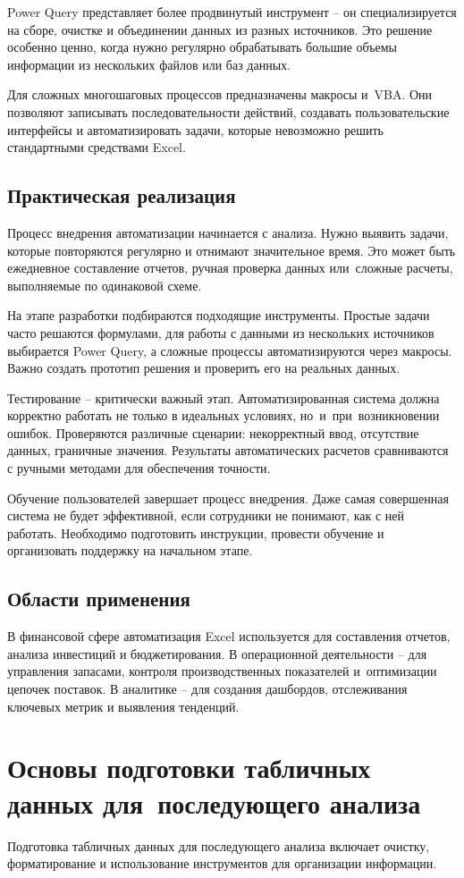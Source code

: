 \documentclass{ou}
\begin{document}
Power Query представляет более продвинутый инструмент -- он специализируется на сборе, очистке и объединении данных из разных источников. Это решение особенно ценно, когда нужно регулярно обрабатывать большие объемы информации из нескольких файлов или баз данных.

Для сложных многошаговых процессов предназначены макросы и~VBA. Они позволяют записывать последовательности действий, создавать пользовательские интерфейсы и автоматизировать задачи, которые невозможно решить стандартными средствами Excel.
\subsection{Практическая реализация}
Процесс внедрения автоматизации начинается с анализа. Нужно выявить задачи, которые повторяются регулярно и отнимают значительное время. Это может быть ежедневное составление отчетов, ручная проверка данных или~сложные расчеты, выполняемые по одинаковой схеме.

На этапе разработки подбираются подходящие инструменты. Простые задачи часто решаются формулами, для работы с данными из нескольких источников выбирается Power Query, а сложные процессы автоматизируются через макросы. Важно создать прототип решения и проверить его на реальных данных.

Тестирование -- критически важный этап. Автоматизированная система должна корректно работать не только в идеальных условиях, но~и~при~возникновении ошибок. Проверяются различные сценарии: некорректный ввод, отсутствие данных, граничные значения. Результаты автоматических расчетов сравниваются с ручными методами для обеспечения точности.

Обучение пользователей завершает процесс внедрения. Даже самая совершенная система не будет эффективной, если сотрудники не понимают, как с ней работать. Необходимо подготовить инструкции, провести обучение и организовать поддержку на начальном этапе.
\subsection{Области применения}
В финансовой сфере автоматизация Excel используется для составления отчетов, анализа инвестиций и бюджетирования. В операционной деятельности -- для управления запасами, контроля производственных показателей и~оптимизации цепочек поставок. В аналитике -- для создания дашбордов, отслеживания ключевых метрик и выявления тенденций.
\newpage
\section{Основы подготовки табличных данных для~последующего анализа}
Подготовка табличных данных для последующего анализа включает очистку, форматирование и использование инструментов для организации информации.
\end{document}
